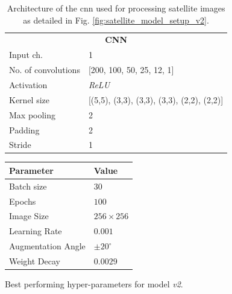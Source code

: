 \def\arraystretch{1.5}
\begin{table}[]
\begin{center}
\begin{tabular}{ll}
\multicolumn{2}{c}{\textbf{CNN}}                                                       \\
\multicolumn{1}{l|}{Input ch.}           & 1                                          \\ \hline
\multicolumn{1}{l|}{No. of convolutions} & [200, 100, 50, 25, 12, 1]                  \\ \hline
\multicolumn{1}{l|}{Activation}          & \emph{ReLU}                                       \\ \hline
\multicolumn{1}{l|}{Kernel size}         & [(5,5), (3,3), (3,3), (3,3), (2,2), (2,2)] \\ \hline
\multicolumn{1}{l|}{Max pooling}         & 2                                          \\ \hline
\multicolumn{1}{l|}{Padding}             & 2                                          \\ \hline
\multicolumn{1}{l|}{Stride}              & 1                                         
\end{tabular}
\end{center}
\caption{Architecture of the \gls{cnn} used for processing satellite images as detailed in Fig. \ref{fig:satellite_model_setup_v2}.}\label{tab:cnn_structure}
\end{table}



\begin{margintable}
\begin{tabular}{@{}ll@{}}
\toprule
\textbf{Parameter} & \textbf{Value}   \\ \midrule
Batch size         & $30$             \\
Epochs             & $100$            \\
Image Size         & $256 \times 256$ \\
Learning Rate      & $0.001$            \\
Augmentation Angle & $\pm 20^{\circ}$ \\
Weight Decay       & $0.0029$         \\ \bottomrule
\end{tabular}
\caption{Best performing hyper-parameters for model \emph{v2}.}\label{tab:hyperparam_rest}
\end{margintable}



